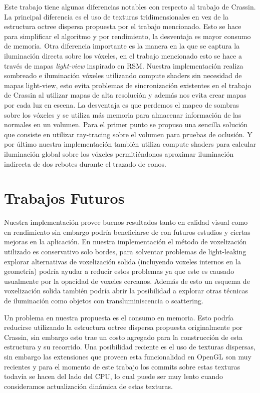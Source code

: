 Este trabajo tiene algunas diferencias notables con respecto al trabajo de Crassin. La principal diferencia es el uso de texturas tridimensionales en vez de la estructura octree dispersa propuesta por el trabajo mencionado. Esto se hace para simplificar el algoritmo y por rendimiento, la desventaja es mayor consumo de memoria. Otra diferencia importante es la manera en la que se captura la iluminación directa sobre los vóxeles, en el trabajo mencionado esto se hace a través de mapas \emph{light-view} inspirado en \acl{RSM}. Nuestra implementación realiza sombreado e iluminación vóxeles utilizando compute shaders sin necesidad de mapas light-view, esto evita problemas de sincronización existentes en el trabajo de Crassin al utilizar mapas de alta resolución y además nos evita crear mapas por cada luz en escena. La desventaja es que perdemos el mapeo de sombras sobre los vóxeles y se utiliza más memoria para almacenar información de las normales en un volumen. Para el primer punto se propuso una sencilla solución que consiste en utilizar ray-tracing sobre el volumen para pruebas de oclusión. Y por último nuestra implementación también utiliza compute shaders para calcular iluminación global sobre los vóxeles permitiéndonos aproximar iluminación indirecta de dos rebotes durante el trazado de conos.

\section{Trabajos Futuros} %
\label{sec:trabajos_futuros}
Nuestra implementación provee buenos resultados tanto en calidad visual como en rendimiento sin embargo podría beneficiarse de con futuros estudios y ciertas mejoras en la aplicación. En nuestra implementación el método de voxelización utilizado es conservativo solo bordes, para solventar problemas de light-leaking explorar alternativas de voxelización solida (incluyendo voxeles internos en la geometría) podría ayudar a reducir estos problemas ya que este es causado usualmente por la opacidad de voxeles cercanos. Además de esto un esquema de voxelización solida también podría abrir la posibilidad a explorar otras técnicas de iluminación como objetos con transluminiscencia o scattering.

Un problema en nuestra propuesta es el consumo en memoria. Esto podría reducirse utilizando la estructura octree dispersa propuesta originalmente por Crassin, sin embargo esto trae un costo agregado para la construcción de esta estructura y su recorrido. Una posibilidad reciente es el uso de texturas dispersas, sin embargo las extensiones que proveen esta funcionalidad en OpenGL son muy recientes y para el momento de este trabajo los commits sobre estas texturas todavía se hacen del lado del CPU, lo cual puede ser muy lento cuando consideramos actualización dinámica de estas texturas.

